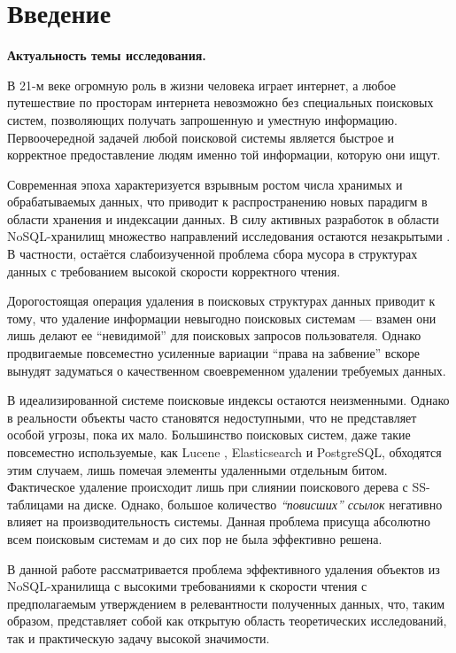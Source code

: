 \newpage
\section{Введение}

\textbf{Актуальность темы исследования.}

В 21-м веке огромную роль в жизни человека играет интернет, а любое путешествие
по просторам интернета невозможно без специальных поисковых систем, позволяющих
получать запрошенную и уместную информацию. Первоочередной задачей любой
поисковой системы является быстрое и корректное предоставление людям именно
той информации, которую они ищут.

Современная эпоха характеризуется взрывным ростом числа хранимых и обрабатываемых
данных, что приводит к распространению новых парадигм в области хранения и
индексации данных. В силу активных разработок в области NoSQL-хранилищ множество
направлений исследования остаются незакрытыми \cite{NeganovMastersthesis}.
В частности, остаётся слабоизученной проблема сбора мусора в структурах данных
с требованием высокой скорости корректного чтения.

Дорогостоящая операция удаления в поисковых структурах данных приводит к тому,
что удаление информации невыгодно поисковых системам — взамен они лишь делают ее
“невидимой” для поисковых запросов пользователя. Однако продвигаемые повсеместно
усиленные вариации “права на забвение” вскоре вынудят задуматься о качественном
своевременном удалении требуемых данных.

В идеализированной системе поисковые индексы остаются неизменными. Однако в
реальности объекты часто становятся недоступными, что не представляет особой
угрозы, пока их мало. Большинство поисковых систем, даже такие повсеместно
используемые, как Lucene \cite{Lucene:2008}, Elasticsearch\cite{Elasticsearch:2020}
и PostgreSQL\cite{GIN:2020}, обходятся этим случаем, лишь помечая элементы
удаленными отдельным битом. Фактическое удаление происходит лишь при слиянии
поискового дерева с SS-таблицами на диске.
Однако, большое количество \textit{“повисших” ссылок} негативно влияет на
производительность системы. Данная проблема присуща абсолютно всем поисковым
системам и до сих пор не была эффективно решена.

В данной работе рассматривается проблема эффективного удаления объектов из
NoSQL-хранилища с высокими требованиями к скорости чтения с предполагаемым
утверждением в релевантности полученных данных, что, таким образом, представляет
собой как открытую область теоретических исследований, так и практическую задачу
высокой значимости.

